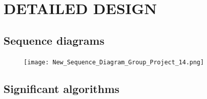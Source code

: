 \documentclass{project}
\begin{document}
\newpage

\section{DETAILED DESIGN}
\subsection{Sequence diagrams}

\begin{figure}[h] 

   
\texttt{[image: New\_Sequence\_Diagram\_Group\_Project\_14.png]}
    
\end{figure}

\newpage

\subsection{Significant algorithms}
\end{document}
